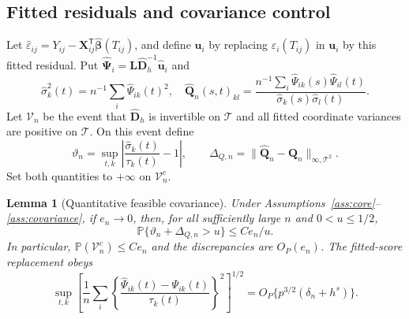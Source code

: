 \documentclass[10pt]{book}
\newtheorem{lemma}{Lemma}
\newcommand{\bu}{{\mathbf u}}
\newcommand{\bD}{{\mathbf D}}
\newcommand{\bL}{{\mathbf L}}
\newcommand{\bQ}{{\mathbf Q}}
\newcommand{\bX}{{\mathbf X}}
\newcommand{\bbeta}  {\boldsymbol{\beta}}
\newcommand{\bPsi} {\boldsymbol{\Psi}}
\newcommand{\prob}{\mathbb{P}}
\newcommand{\trans}{{\scriptscriptstyle\mathsf{T}}}
\numberwithin{equation}{section}
\begin{document}
\subsection{Fitted residuals and covariance control}

Let $\widehat\varepsilon_{ij}=Y_{ij}-\bX_{ij}^\trans
\widehat{\bbeta}(T_{ij})$, and define $\widehat\bu_i$ by replacing
$\varepsilon_i(T_{ij})$ in $\bu_i$ by this fitted residual.  Put
$\widehat{\bPsi}_i=\bL\widehat{\bD}_h^{-1}\widehat\bu_i$ and
\[
\widehat\sigma_k^2(t)=n^{-1}\sum_i\widehat\Psi_{ik}(t)^2,
\quad
\widehat{\bQ}_n(s,t)_{kl}=
\frac{n^{-1}\sum_i\widehat\Psi_{ik}(s)\widehat\Psi_{il}(t)}
{\widehat\sigma_k(s)\widehat\sigma_l(t)}.
\]
Let $\mathcal V_n$ be the event that $\widehat{\bD}_h$ is invertible
on $\mathcal T$ and all fitted coordinate variances are positive
on $\mathcal T$.  On this event define
\[
\vartheta_n=\sup_{t,k}\left|
\frac{\widehat\sigma_k(t)}{\tau_k(t)}-1\right|,
\qquad
\Delta_{Q,n}=\|\widehat{\bQ}_n-\bQ_n\|_{\infty,\mathcal T^2}.
\]
Set both quantities to $+\infty$ on $\mathcal V_n^c$.

\begin{lemma}[Quantitative feasible covariance]
\label{lem:hd-feasible-covariance}
Under Assumptions~\ref{ass:core}--\ref{ass:covariance}, if $e_n\to0$,
then, for all sufficiently large $n$ and $0<u\le1/2$,
\[
\prob\{\vartheta_n+\Delta_{Q,n}>u\}\le Ce_n/u.
\]
In particular, $\prob(\mathcal V_n^c)\le Ce_n$ and the discrepancies
are $O_P(e_n)$.  The fitted-score replacement obeys
\[
\sup_{t,k}\left[
\frac1n\sum_i
\left\{\frac{\widehat\Psi_{ik}(t)-\Psi_{ik}(t)}{\tau_k(t)}\right\}^2
\right]^{1/2}
=O_P\{p^{3/2}(\delta_n+h^s)\}.
\]
\end{lemma}
\end{document}
